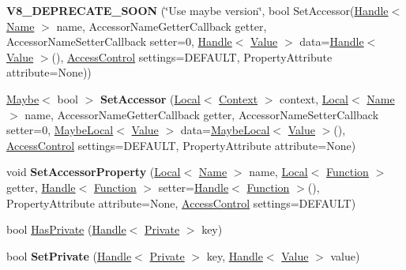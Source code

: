 \begin{DoxyCompactItemize}
\item 
\hypertarget{classv8_1_1_object_a0f251df58f29449e5d93bc39bbafbc99}{}{\bfseries V8\+\_\+\+D\+E\+P\+R\+E\+C\+A\+T\+E\+\_\+\+S\+O\+O\+N} (\char`\"{}Use maybe version\char`\"{}, bool Set\+Accessor(\hyperlink{classv8_1_1_local}{Handle}$<$ \hyperlink{classv8_1_1_name}{Name} $>$ name, Accessor\+Name\+Getter\+Callback getter, Accessor\+Name\+Setter\+Callback setter=0, \hyperlink{classv8_1_1_local}{Handle}$<$ \hyperlink{classv8_1_1_value}{Value} $>$ data=\hyperlink{classv8_1_1_local}{Handle}$<$ \hyperlink{classv8_1_1_value}{Value} $>$(), \hyperlink{namespacev8_a31d8355cb043d7d2dda3f4a52760b64e}{Access\+Control} settings=D\+E\+F\+A\+U\+L\+T, Property\+Attribute attribute=None))\label{classv8_1_1_object_a0f251df58f29449e5d93bc39bbafbc99}

\item 
\hypertarget{classv8_1_1_object_a6ab0b45aa38debc2cc9877ae3b232e55}{}\hyperlink{classv8_1_1_maybe}{Maybe}$<$ bool $>$ {\bfseries Set\+Accessor} (\hyperlink{classv8_1_1_local}{Local}$<$ \hyperlink{classv8_1_1_context}{Context} $>$ context, \hyperlink{classv8_1_1_local}{Local}$<$ \hyperlink{classv8_1_1_name}{Name} $>$ name, Accessor\+Name\+Getter\+Callback getter, Accessor\+Name\+Setter\+Callback setter=0, \hyperlink{classv8_1_1_maybe_local}{Maybe\+Local}$<$ \hyperlink{classv8_1_1_value}{Value} $>$ data=\hyperlink{classv8_1_1_maybe_local}{Maybe\+Local}$<$ \hyperlink{classv8_1_1_value}{Value} $>$(), \hyperlink{namespacev8_a31d8355cb043d7d2dda3f4a52760b64e}{Access\+Control} settings=D\+E\+F\+A\+U\+L\+T, Property\+Attribute attribute=None)\label{classv8_1_1_object_a6ab0b45aa38debc2cc9877ae3b232e55}

\item 
\hypertarget{classv8_1_1_object_a498f3ad26e24eae04eb76a270c1cc2b2}{}void {\bfseries Set\+Accessor\+Property} (\hyperlink{classv8_1_1_local}{Local}$<$ \hyperlink{classv8_1_1_name}{Name} $>$ name, \hyperlink{classv8_1_1_local}{Local}$<$ \hyperlink{classv8_1_1_function}{Function} $>$ getter, \hyperlink{classv8_1_1_local}{Handle}$<$ \hyperlink{classv8_1_1_function}{Function} $>$ setter=\hyperlink{classv8_1_1_local}{Handle}$<$ \hyperlink{classv8_1_1_function}{Function} $>$(), Property\+Attribute attribute=None, \hyperlink{namespacev8_a31d8355cb043d7d2dda3f4a52760b64e}{Access\+Control} settings=D\+E\+F\+A\+U\+L\+T)\label{classv8_1_1_object_a498f3ad26e24eae04eb76a270c1cc2b2}

\item 
bool \hyperlink{classv8_1_1_object_a5b6c320c5a31e2a3ddbd464835c8e9a7}{Has\+Private} (\hyperlink{classv8_1_1_local}{Handle}$<$ \hyperlink{classv8_1_1_private}{Private} $>$ key)
\item 
\hypertarget{classv8_1_1_object_abb91701c8fbad34a4c0ccd3c7e18be28}{}bool {\bfseries Set\+Private} (\hyperlink{classv8_1_1_local}{Handle}$<$ \hyperlink{classv8_1_1_private}{Private} $>$ key, \hyperlink{classv8_1_1_local}{Handle}$<$ \hyperlink{classv8_1_1_value}{Value} $>$ value)\label{classv8_1_1_object_abb91701c8fbad34a4c0ccd3c7e18be28}


\end{DoxyCompactItemize}
